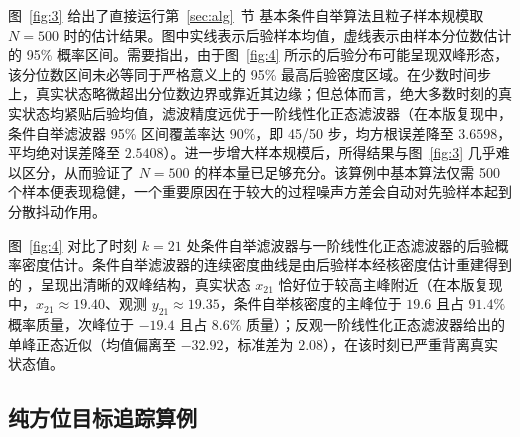 图~\ref{fig:3} 给出了直接运行第~\ref{sec:alg}~节 基本条件自举算法且粒子样本规模取 $N = 500$ 时的估计结果。图中实线表示后验样本均值，虚线表示由样本分位数估计的 95\% 概率区间。需要指出，由于图~\ref{fig:4} 所示的后验分布可能呈现双峰形态，该分位数区间未必等同于严格意义上的 95\% 最高后验密度区域。在少数时间步上，真实状态略微超出分位数边界或靠近其边缘；但总体而言，绝大多数时刻的真实状态均紧贴后验均值，滤波精度远优于一阶线性化正态滤波器（在本版复现中，条件自举滤波器 95\% 区间覆盖率达 $90\%$，即 45/50 步，均方根误差降至 $3.6598$，平均绝对误差降至 $2.5408$）。进一步增大样本规模后，所得结果与图~\ref{fig:3} 几乎难以区分，从而验证了 $N = 500$ 的样本量已足够充分。该算例中基本算法仅需 500 个样本便表现稳健，一个重要原因在于较大的过程噪声方差会自动对先验样本起到分散抖动作用。


图~\ref{fig:4} 对比了时刻 $k = 21$ 处条件自举滤波器与一阶线性化正态滤波器的后验概率密度估计。条件自举滤波器的连续密度曲线是由后验样本经核密度估计重建得到的 \cite{r13}，呈现出清晰的双峰结构，真实状态 $x_{21}$ 恰好位于较高主峰附近（在本版复现中，$x_{21} \approx 19.40$、观测 $y_{21} \approx 19.35$，条件自举核密度的主峰位于 $19.6$ 且占 $91.4\%$ 概率质量，次峰位于 $-19.4$ 且占 $8.6\%$ 质量）；反观一阶线性化正态滤波器给出的单峰正态近似（均值偏离至 $-32.92$，标准差为 $2.08$），在该时刻已严重背离真实状态值。


\subsection{纯方位目标追踪算例}\label{sec:sim-bearings}


